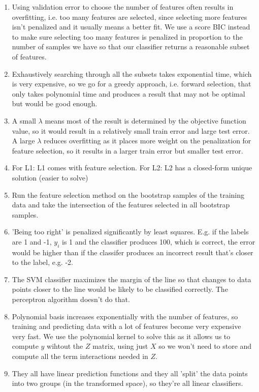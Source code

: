 \documentclass{article}
\def\enum#1{\begin{enumerate}#1\end{enumerate}}
\begin{document}
\enum{
\item Using validation error to choose the number of features often results in overfitting, i.e. too many features are selected, since selecting more features isn't penalized and it usually means a better fit. We use a score BIC instead to make sure selecting too many features is penalized in proportion to the number of samples we have so that our classifier returns a reasonable subset of features.
\item Exhaustively searching through all the subsets takes exponential time, which is very expensive, so we go for a greedy approach, i.e. forward selection, that only takes polynomial time and produces a result that may not be optimal but would be good enough.
\item A small $\lambda$ means most of the result is determined by the objective function value, so it would result in a relatively small train error and large test error. A large $\lambda$ reduces overfitting as it places more weight on the penalization for feature selection, so it results in a larger train error but smaller test error.
\item For L1: L1 comes with feature selection. For L2: L2 has a closed-form unique solution (easier to solve)
\item Run the feature selection method on the bootstrap samples of the training data and take the intersection of the features selected in all bootstrap samples.
\item 'Being too right' is penalized significantly by least squares. E.g. if the labels are 1 and -1, $y_i$ is 1 and the classifier produces 100, which is correct, the error would be higher than if the classifer produces an incorrect result that's closer to the label, e.g. -2.
\item The SVM classifier maximizes the margin of the line so that changes to data points closer to the line would be likely to be classified correctly. The perceptron algorithm doesn't do that.
\item Polynomial basis increases exponentially with the number of features, so training and predicting data with a lot of features become very expensive very fast. We use the polynomial kernel to solve this as it allows us to compute $y$ wihtout the $Z$ matrix, using just $X$ so we won't need to store and compute all the term interactions needed in $Z$.
\item They all have linear prediction functions and they all 'split' the data points into two groups (in the transformed space), so they're all linear classifiers.
}
\end{document}
